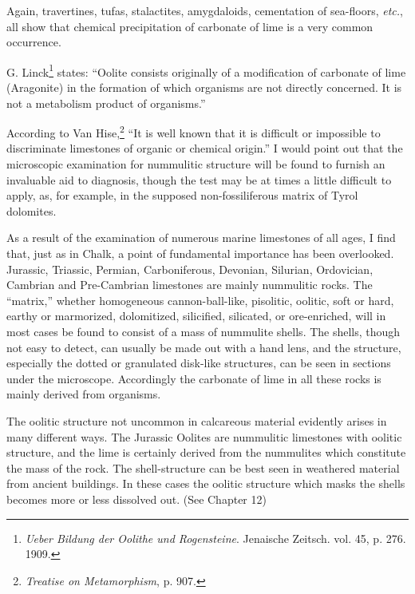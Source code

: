 \documentclass[a4paper, 12pt, oneside, landscape]{article}
\begin{document}
Again, travertines, tufas, stalactites, amygdaloids, cementation of sea-floors, \emph{etc.}, all show that chemical precipitation of carbonate of lime is a very common occurrence.

G. Linck\footnote{\emph{Ueber Bildung der Oolithe und Rogensteine}. Jenaische Zeitsch. vol. 45, p. 276. 1909.} states: ``Oolite consists originally of a modification of carbonate of lime (Aragonite) in the formation of which organisms are not directly concerned. It is not a metabolism product of organisms.''

According to Van Hise,\footnote{\emph{Treatise on Metamorphism}, p. 907.} ``It is well known that it is difficult or impossible to discriminate limestones of organic or chemical origin.'' I would point out that the microscopic examination for nummulitic structure will be found to furnish an invaluable aid to diagnosis, though the test may be at times a little difficult to apply, as, for example, in the supposed non-fossiliferous matrix of Tyrol dolomites.

As a result of the examination of numerous marine limestones of all ages, I find that, just as in Chalk, a point of fundamental importance has been overlooked. Jurassic, Triassic, Permian, Carboniferous, Devonian, Silurian, Ordovician, Cambrian and Pre-Cambrian limestones are mainly nummulitic rocks. The ``matrix,'' whether homogeneous cannon-ball-like, pisolitic, oolitic, soft or hard, earthy or marmorized, dolomitized, silicified, silicated, or ore-enriched, will in most cases be found to consist of a mass of nummulite shells. The shells, though not easy to detect, can usually be made out with a hand lens, and the structure, especially the dotted or granulated disk-like structures, can be seen in sections under the microscope. Accordingly the carbonate of lime in all these rocks is mainly derived from organisms.

The oolitic structure not uncommon in calcareous material evidently arises in many different ways. The Jurassic Oolites are nummulitic limestones with oolitic structure, and the lime is certainly derived from the nummulites which constitute the mass of the rock. The shell-structure can be best seen in weathered material from ancient buildings. In these cases the oolitic structure which masks the shells becomes more or less dissolved out. (See Chapter 12)
\end{document}
